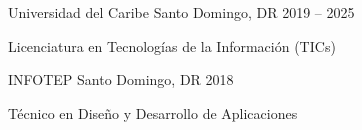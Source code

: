 \documentclass[]{awesome-cv}
\begin{document}
\begin{cventries}
	\vspace{-3mm}
	\cventry
	{}
	{Universidad del Caribe \vspace{-5mm}}
	{Santo Domingo, DR \vspace{-5mm}}
	{2019 -- 2025 \vspace{-5mm}}
	{\begin{cvsectionnormaltext}
		\item{Licenciatura en Tecnolog\'{i}as de la Informaci\'{o}n (TICs)}
	\end{cvsectionnormaltext}}

	\vspace{-3mm}
	\cventry
	{}
	{INFOTEP \vspace{-5mm}}
	{Santo Domingo, DR \vspace{-5mm}}
	{2018 \vspace{-5mm}}
	{\begin{cvsectionnormaltext}
		\item{T\'{e}cnico en Dise\~{n}o y Desarrollo de Aplicaciones}
	\end{cvsectionnormaltext}}
\end{cventries}
\end{document}
